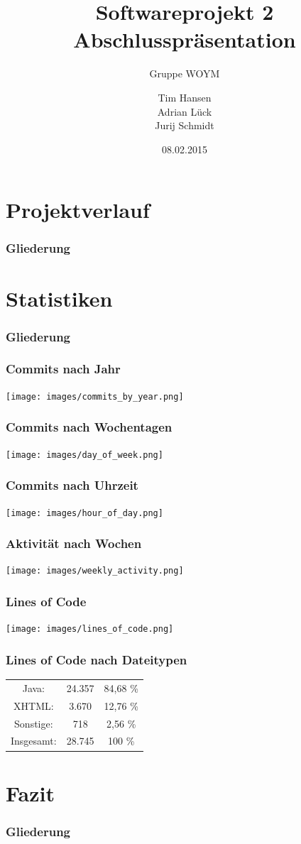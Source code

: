 \documentclass{beamer}
\title{Softwareprojekt 2 Abschlusspräsentation}
\subtitle{Gruppe WOYM}
\date{08.02.2015}
\author{Tim Hansen\\ Adrian Lück\\ Jurij Schmidt}
\institute{Universität Bremen}
\begin{document}
\maketitle

\section{Projektverlauf}
\begin{frame}
\frametitle{Gliederung}
\tableofcontents[currentsection]
\end{frame}



\section{Statistiken}

\begin{frame}
\frametitle{Gliederung}
\tableofcontents[currentsection]
\end{frame}

\begin{frame}
\frametitle{Commits nach Jahr}
\texttt{[image: images/commits\_by\_year.png]}
\end{frame}

\begin{frame}
\frametitle{Commits nach Wochentagen}
\texttt{[image: images/day\_of\_week.png]}
\end{frame}

\begin{frame}
\frametitle{Commits nach Uhrzeit}
\texttt{[image: images/hour\_of\_day.png]}
\end{frame}

\begin{frame}
\frametitle{Aktivität nach Wochen}
\texttt{[image: images/weekly\_activity.png]}
\end{frame}

\begin{frame} 
  \frametitle{Lines of Code}
  \texttt{[image: images/lines\_of\_code.png]}
\end{frame}

\begin{frame}
\frametitle{Lines of Code nach Dateitypen}
\renewcommand{\arraystretch}{2}
\begin{table}
\centering
\begin{tabular}{ccc}
Java: & 24.357 & 84,68 \%\\
XHTML: & 3.670  & 12,76 \%\\
Sonstige: & 718  & 2,56 \%\\
\hline\hline
Insgesamt: & 28.745 & 100 \%\\
\end{tabular}
\end{table}
\end{frame}

\section{Fazit}
\begin{frame}
\frametitle{Gliederung}
\tableofcontents[currentsection]
\end{frame}
\end{document}
